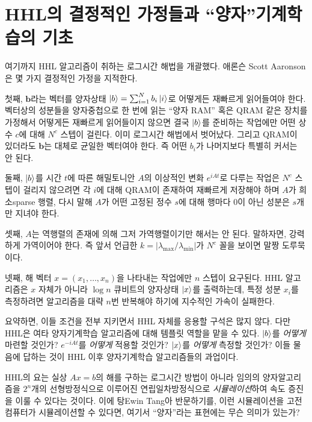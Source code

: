 \documentclass[a4paper,atbegshi,chapter,itemph,hidelinks]{oblivoir}
\begin{document}
\section{HHL의 결정적인 가정들과 ``양자''기계학습의 기초}
여기까지 HHL 알고리즘이 취하는 로그시간 해법을 개괄했다. 애론슨{\footnotesize
Scott Aaronson}은 몇 가지 결정적인 가정을 지적한다.

첫째, $\mathbf{b}$라는 벡터를 양자상태 $\ket{b}=\sum_{i=1}^Nb_i\ket{i}$로 어떻게든
재빠르게 읽어들여야 한다. 벡터상의 성분들을 양자중첩으로 한 번에 읽는
``양자 RAM'' 혹은 QRAM 같은 장치를 가정해서 어떻게든 재빠르게 읽어들이지
않으면 결국 $\ket{b}$를 준비하는 작업에만 어떤 상수 $c$에 대해 $N^c$ 스텝이
걸린다. 이미 로그시간 해법에서 벗어났다. 그리고 QRAM이 있더라도 $\mathbf{b}$는
대체로 균일한 벡터여야 한다. 즉 어떤 $b_i$가 나머지보다 특별히 커서는 안 된다.

둘째, $\ket{b}$를 시간 $t$에 따른 해밀토니안 $A$의 이상적인 변화
$e^{iAt}$로 다루는 작업은 $N^c$ 스텝이 걸리지 않으려면 각 $i$에 대해 QRAM이
존재하여 재빠르게 저장해야 하며 $A$가 희소{\footnotesize sparse} 행렬, 다시
말해 $A$가 어떤 고정된 정수 $s$에 대해 행마다 $0$이 아닌 성분은 $s$개만 지녀야
한다.

셋째, $A$는 역행렬의 존재에 의해 그저 가역행렬이기만 해서는 안 된다. 말하자면,
강력하게 가역이어야 한다. 즉 앞서 언급한 $k=|\lambda_{\max}/\lambda_{\min}|$가
$N^c$ 꼴을 보이면 말짱 도루묵이다.

넷째, 해 벡터 $x=(x_1,\ldots,x_n)$을 나타내는 작업에만 $n$ 스텝이 요구된다.
HHL 알고리즘은 $x$ 자체가 아니라 $\log n$ 큐비트의 양자상태 $\ket{x}$를
출력하는데, 특정 성분 $x_i$를 측정하려면 알고리즘을 대략 $n$번 반복해야
하기에 지수적인 가속이 실패한다.

요약하면, 이들 조건을 전부 지키면서 HHL 자체를 응용할 구석은 많지 않다. 다만
HHL은 여타 양자기계학습 알고리즘에 대해 템플릿 역할을 맡을 수 있다. $\ket{b}$를
\emph{어떻게} 마련할 것인가? $e^{-iAt}$를 \emph{어떻게} 적용할 것인가? 
$\ket{x}$를 \emph{어떻게} 측정할 것인가? 이들 물음에 답하는 것이 HHL 이후
양자기계학습 알고리즘들의 과업이다. 

HHL의 요는 실상 $Ax=b$의 해를 구하는 로그시간 방법이 아니라 임의의 양자알고리즘을
$2^n$개의 선형방정식으로 이루어진 연립일차방정식으로 \emph{시뮬레이션}하여  
속도 증진을 이룰 수 있다는 것이다. 이에 탕{\footnotesize Ewin Tang}아 반문하기를,
이런 시뮬레이션을 고전 컴퓨터가 시뮬레이션할 수 있다면, 여기서 ``양자''라는 
표현에는 무슨 의미가 있는가?
\end{document}
